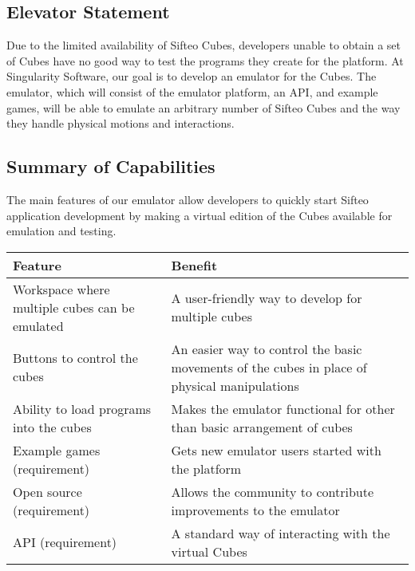 \documentclass[12pt]{article}
\begin{document}
              \subsection{Elevator Statement}
              Due to the limited availability of Sifteo Cubes, developers unable to obtain a set of Cubes have no good way to test the programs they create for the platform. At Singularity Software, our goal is to develop an emulator for the Cubes. The emulator, which will consist of the emulator platform, an API, and example games, will be able to emulate an arbitrary number of Sifteo Cubes and the way they handle physical motions and interactions.
\clearpage
              \subsection{Summary of Capabilities}
              The main features of our emulator allow developers to quickly start Sifteo application development by making a virtual edition of the Cubes available for emulation and testing.
              \begin{table}[h]
                \begin{tabular}{p{3in} | p{3in}}
                  \textbf{Feature} & \textbf{Benefit} \\ \hline
                  Workspace where multiple cubes can be emulated
                            & A user-friendly way to develop for multiple cubes \\ \hline
                  Buttons to control the cubes
                            & An easier way to control the basic movements of the cubes in place of physical manipulations \\ \hline
                  Ability to load programs into the cubes
                            & Makes the emulator functional for other than basic arrangement of cubes \\ \hline
                  Example games (requirement)
                            & Gets new emulator users started with the platform \\ \hline
                  Open source\index{Open source}  (requirement)
                            & Allows the community to contribute improvements to the emulator \\ \hline
                  API\index{API} (requirement)
                            & A standard way of interacting with the virtual Cubes
                \end{tabular}
              \end{table}
\end{document}
